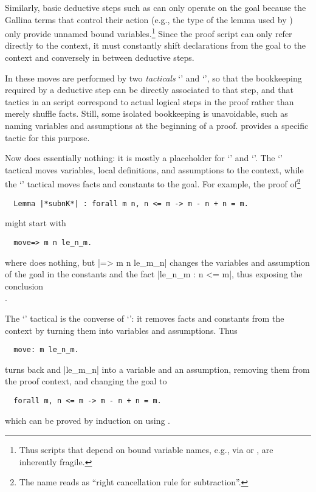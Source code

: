 Similarly, basic deductive steps such as  can only operate on
the goal because the Gallina terms that control their action (e.g.,
the type of the lemma used by ) only provide unnamed bound
variables.\footnote{Thus scripts that depend on bound variable names, e.g.,
via  or , are inherently fragile.}  Since the proof
script can only refer directly to the context, it must constantly
shift declarations from the goal to the context and conversely in
between deductive steps.

In \ssr{} these moves are performed by two \emph{tacticals} `\ssrC{=>}'
and `\ssrC{:}', so that the bookkeeping required by a deductive step can
be directly associated to that step, and that tactics in an \ssr{}
script correspond to actual logical steps in the proof rather than
merely shuffle facts. Still, some isolated bookkeeping is unavoidable,
such as naming variables and assumptions at the beginning of a proof.
\ssr{} provides a specific  tactic for this purpose.

Now  does essentially nothing: it is mostly a placeholder for
`\ssrC{=>}' and `\ssrC{:}'. The `\ssrC{=>}' tactical moves variables, local
definitions, and assumptions to the context, while the `\ssrC{:}'
tactical moves facts and constants to the goal. For example, the proof
of\footnote{The name  reads as
``right cancellation rule for  subtraction''.}
\begin{lstlisting}
  Lemma |*subnK*| : forall m n, n <= m -> m - n + n = m.
\end{lstlisting}\noindent
might start with
\begin{lstlisting}
  move=> m n le_n_m.
\end{lstlisting}
where  does nothing, but \ssrL|=> m n le_m_n| changes the
variables and assumption of the goal in the constants 
and the fact \ssrL|le_n_m : n <= m|, thus exposing the conclusion\\
 .

The `\ssrC{:}' tactical is the converse of `\ssrC{=>}': it removes facts
and constants from the context by turning them into variables and assumptions.
Thus
\begin{lstlisting}
  move: m le_n_m.
\end{lstlisting}
turns back  and \ssrL|le_m_n| into a variable and an assumption, removing
them from the proof context, and changing the goal to
\begin{lstlisting}
  forall m, n <= m -> m - n + n = m.
\end{lstlisting}
which can be proved by induction on  using .

